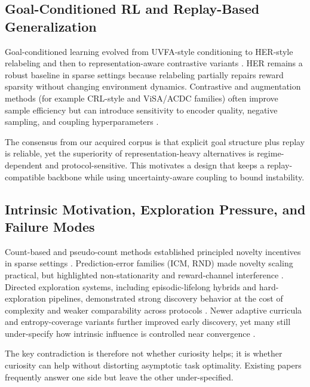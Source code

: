 \documentclass{article} %
\begin{document}
\subsection{Goal-Conditioned RL and Replay-Based Generalization}

Goal-conditioned learning evolved from UVFA-style conditioning to HER-style relabeling and then to representation-aware contrastive variants \citep{ref_universal_value_function_approximators_2015, arxiv1707_01495, arxiv1903_03698, arxiv1912_06088, arxiv2206_07568}. HER remains a robust baseline in sparse settings because relabeling partially repairs reward sparsity without changing environment dynamics. Contrastive and augmentation methods (for example CRL-style and ViSA/ACDC families) often improve sample efficiency but can introduce sensitivity to encoder quality, negative sampling, and coupling hyperparameters \citep{arxiv2206_07568, arxiv2603_14887, arxiv2603_02104, arxiv2603_29533}.

The consensus from our acquired corpus is that explicit goal structure plus replay is reliable, yet the superiority of representation-heavy alternatives is regime-dependent and protocol-sensitive. This motivates a design that keeps a replay-compatible backbone while using uncertainty-aware coupling to bound instability.

\subsection{Intrinsic Motivation, Exploration Pressure, and Failure Modes}

Count-based and pseudo-count methods established principled novelty incentives in sparse settings \citep{arxiv1606_01868}. Prediction-error families (ICM, RND) made novelty scaling practical, but highlighted non-stationarity and reward-channel interference \citep{arxiv1703_01310, arxiv1810_12894}. Directed exploration systems, including episodic-lifelong hybrids and hard-exploration pipelines, demonstrated strong discovery behavior at the cost of complexity and weaker comparability across protocols \citep{arxiv2002_06038, arxiv2003_13350, arxiv1901_10995}. Newer adaptive curricula and entropy-coverage variants further improved early discovery, yet many still under-specify how intrinsic influence is controlled near convergence \citep{arxiv2412_03800, arxiv2505_19850, arxiv2509_03790, arxiv2602_24081}.

The key contradiction is therefore not whether curiosity helps; it is whether curiosity can help without distorting asymptotic task optimality. Existing papers frequently answer one side but leave the other under-specified.
\end{document}
